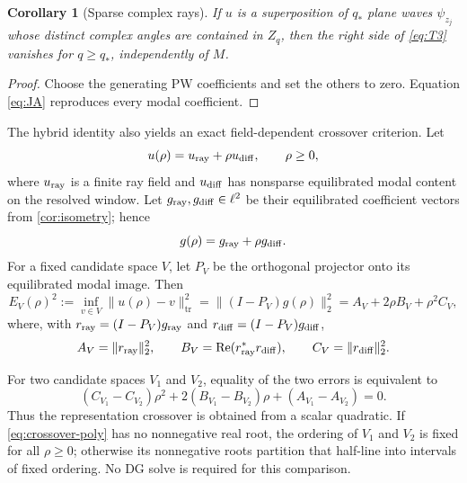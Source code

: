 \documentclass[11pt]{article}
\newtheorem{corollary}[theorem]{Corollary}
\newcommand{\trnorm}[1]{\lVert #1\rVert_{\mathrm{tr}}}
\renewcommand{\Re}{\operatorname{Re}}
\numberwithin{equation}{section}
\begin{document}
\begin{corollary}[Sparse complex rays]\label{cor:sparse}
If $u$ is a superposition of $q_*$ plane waves $\psi_{z_j}$ whose distinct complex angles are contained in $Z_q$, then the right side of \eqref{eq:T3} vanishes for $q\ge q_*$, independently of $M$.
\end{corollary}
\begin{proof}
Choose the generating PW coefficients and set the others to zero.  Equation \eqref{eq:JA} reproduces every modal coefficient.
\end{proof}

The hybrid identity also yields an exact field-dependent crossover criterion.
Let
\begin{equation}\label{eq:rho-field}
 u(\rho)=u_{\rm ray}+\rho u_{\rm diff},\qquad \rho\ge0,
\end{equation}
where $u_{\rm ray}$ is a finite ray field and $u_{\rm diff}$ has nonsparse equilibrated modal content on the resolved window.  Let $g_{\rm ray},g_{\rm diff}\in\ell^2$ be their equilibrated coefficient vectors from \cref{cor:isometry}; hence
\begin{equation}\label{eq:g-rho}
 g(\rho)=g_{\rm ray}+\rho g_{\rm diff}.
\end{equation}
For a fixed candidate space $V$, let $P_V$ be the orthogonal projector onto its equilibrated modal image.  Then
\begin{equation}\label{eq:EV}
 E_V(\rho)^2:=\inf_{v\in V}\trnorm{u(\rho)-v}^2
 =\|(I-P_V)g(\rho)\|_2^2
 =A_V+2\rho B_V+\rho^2C_V,
\end{equation}
where, with $r_{\rm ray}=(I-P_V)g_{\rm ray}$ and $r_{\rm diff}=(I-P_V)g_{\rm diff}$,
\begin{equation}\label{eq:ABC}
 A_V=\|r_{\rm ray}\|_2^2,\qquad
 B_V=\Re(r_{\rm ray}^*r_{\rm diff}),\qquad
 C_V=\|r_{\rm diff}\|_2^2.
\end{equation}

For two candidate spaces $V_1$ and $V_2$, equality of the two errors is equivalent to
\begin{equation}\label{eq:crossover-poly}
 (C_{V_1}-C_{V_2})\rho^2+2(B_{V_1}-B_{V_2})\rho+(A_{V_1}-A_{V_2})=0 .
\end{equation}
Thus the representation crossover is obtained from a scalar quadratic.  If \eqref{eq:crossover-poly} has no nonnegative real root, the ordering of $V_1$ and $V_2$ is fixed for all $\rho\ge0$; otherwise its nonnegative roots partition that half-line into intervals of fixed ordering.  No DG solve is required for this comparison.
\end{document}
